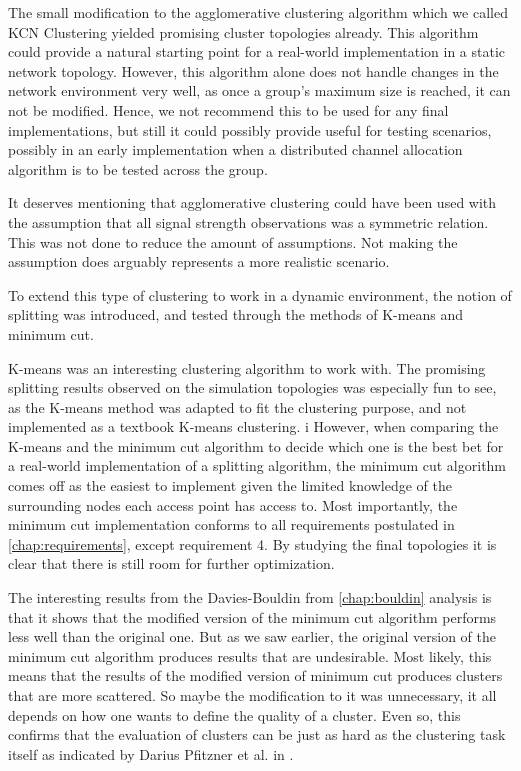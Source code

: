 The small modification to the agglomerative clustering algorithm which we called KCN Clustering yielded promising cluster topologies already.
This algorithm could provide a natural starting point for a real-world implementation in a static network topology.
However, this algorithm alone does not handle changes in the network environment very well, as once a group's maximum size is reached, it can not be modified. 
Hence, we not recommend this to be used for any final implementations, but still it could possibly provide useful for testing scenarios, possibly in an early
implementation when a distributed channel allocation algorithm is to be tested across the group.

It deserves mentioning that agglomerative clustering could have been used with the assumption that all signal strength observations was a symmetric relation.
This was not done to reduce the amount of assumptions. Not making the assumption does arguably represents a more realistic scenario. 

To extend this type of clustering to work in a dynamic environment, the notion of splitting was introduced, and tested through the methods of K-means and minimum cut.

K-means was an interesting clustering algorithm to work with. The promising splitting results observed on the simulation topologies was especially fun to see, as
the K-means method was adapted to fit the clustering purpose, and not implemented as a textbook K-means clustering.
i
However, when comparing the K-means and the minimum cut algorithm to decide which one is the best bet for a real-world implementation of a splitting algorithm,
the minimum cut algorithm comes off as the easiest to implement given the limited knowledge of the surrounding nodes each access point has access to.
Most importantly, the minimum cut implementation conforms to all requirements postulated in \ref{chap:requirements}, except requirement 4. By studying the
final topologies it is clear that there is still room for further optimization.

The interesting results from the Davies-Bouldin from \ref{chap:bouldin} analysis is that it shows that the modified version of the minimum cut algorithm performs less well than the original one.  
But as we saw earlier, the original version of the minimum cut algorithm produces results that are undesirable. Most likely, this means that the results
of the modified version of minimum cut produces clusters that are more scattered. So maybe the modification to it was unnecessary, it all depends on how one wants
to define the quality of a cluster. Even so, this confirms that the evaluation of clusters can be just as hard as the clustering task itself as indicated by Darius Pfitzner et al. in \cite{fitzner}.



